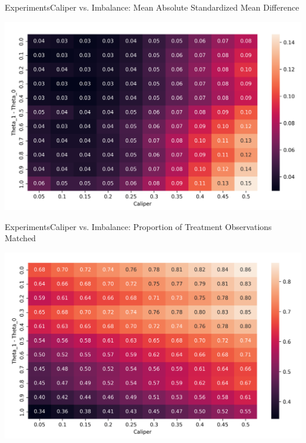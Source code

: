 \documentclass[11pt, compress]{beamer}
\begin{document}
\begin{frame}{Experiments}{Caliper vs. Imbalance: Mean Absolute Standardized Mean Difference}
	\begin{center}
		\includegraphics[width=\textwidth]{../paper/img/output30/caliper_vs_imbalance_big/plots/theta1_caliper_mean_abs_smd.png}
	\end{center}
\end{frame}
\begin{frame}{Experiments}{Caliper vs. Imbalance: Proportion of Treatment Observations Matched}
	\begin{center}
		\includegraphics[width=\textwidth]{../paper/img/output30/caliper_vs_imbalance_big/plots/theta1_caliper_prop1_match.png}
	\end{center}
\end{frame}
\end{document}
